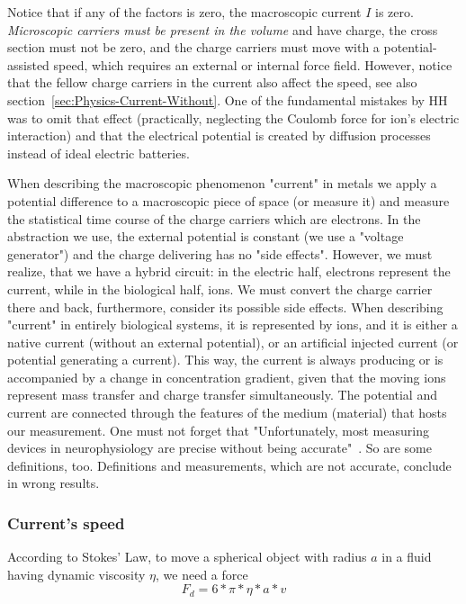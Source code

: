 Notice that if any of the factors is zero, the macroscopic current
$I$ is zero. \textit{Microscopic carriers must be present in the volume}
and have charge, the cross section must not be zero, and the charge
carriers must move with a potential-assisted speed, which requires an external or internal force field.
However, notice that the fellow charge carriers in the current also affect the speed, see also section~\ref{sec:Physics-Current-Without}.
One of the fundamental mistakes by HH was to omit that effect
(practically, neglecting the Coulomb force for ion's electric interaction)
and that the electrical potential is created by diffusion processes instead
of ideal electric batteries.

When describing the macroscopic phenomenon "current" in metals we apply a potential difference
to a macroscopic piece of space (or measure it) and measure the statistical time course of the charge carriers which are electrons. In the abstraction we use, the external potential is constant (we use a "voltage generator") and the charge delivering has no "side effects".
However, we must realize, that we have a hybrid circuit: in the electric half, electrons represent the current, while in the biological half, ions. We must convert the charge carrier there and back, furthermore, consider its possible side effects.
When describing "current" in entirely biological systems, it is represented by ions, and it is either a native current (without an external potential), or an artificial injected current (or potential generating a current).
This way, the current is always producing or is accompanied by a change in concentration gradient, given that the moving ions represent mass transfer and charge transfer simultaneously.
The potential and current are
connected through the features of the medium (material) that hosts
our measurement. One must not forget that "Unfortunately, most measuring devices in neurophysiology are precise without being accurate"~\cite{JohnstonWuNeurophysiology:1995}. So are some definitions, too.
Definitions and measurements, which are not accurate, conclude in wrong results.

\subsubsection[Speed]{Current's speed\label{sec:Calculating-ion's-speed}}
According to \hypertarget{StokesCurrent}{Stokes' Law}, to move a spherical object
with radius $a$ in a fluid having dynamic viscosity $\eta$, we need
a force
%
\begin{equation}
F_{d}=6*\pi*\eta*a*v\label{eq:StokesForceOnIon}
\end{equation}

